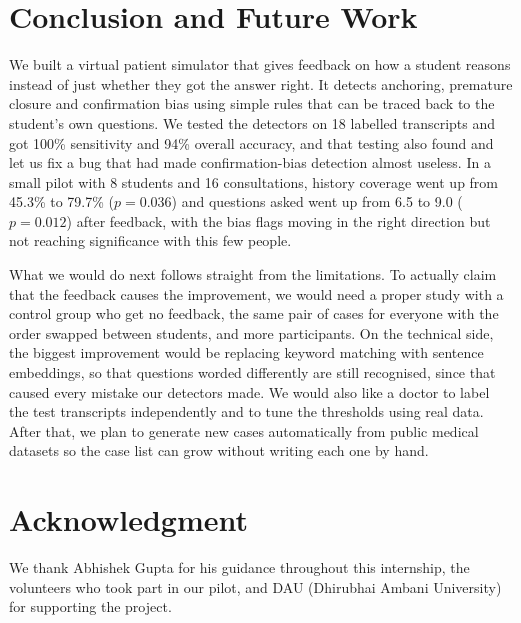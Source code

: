 \documentclass[conference]{IEEEtran}
\begin{document}
\section{Conclusion and Future Work}
We built a virtual patient simulator that gives feedback on how a student
reasons instead of just whether they got the answer right. It detects anchoring,
premature closure and confirmation bias using simple rules that can be traced
back to the student's own questions. We tested the detectors on 18 labelled
transcripts and got 100\% sensitivity and 94\% overall accuracy, and that testing
also found and let us fix a bug that had made confirmation-bias detection almost
useless. In a small pilot with 8 students and 16 consultations, history coverage
went up from 45.3\% to 79.7\% ($p=0.036$) and questions asked went up from 6.5 to
9.0 ($p=0.012$) after feedback, with the bias flags moving in the right direction
but not reaching significance with this few people.

What we would do next follows straight from the limitations. To actually claim
that the feedback causes the improvement, we would need a proper study with a
control group who get no feedback, the same pair of cases for everyone with the
order swapped between students, and more participants. On the technical side, the
biggest improvement would be replacing keyword matching with sentence embeddings,
so that questions worded differently are still recognised, since that caused
every mistake our detectors made. We would also like a doctor to label the test
transcripts independently and to tune the thresholds using real data. After that,
we plan to generate new cases automatically from public medical datasets so the
case list can grow without writing each one by hand.

\section*{Acknowledgment}
We thank Abhishek Gupta for his guidance throughout this internship, the
volunteers who took part in our pilot, and DAU (Dhirubhai Ambani University) for
supporting the project.
\end{document}
